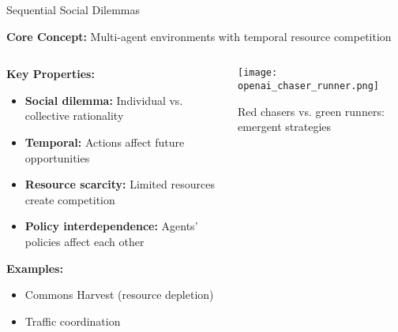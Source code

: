 \documentclass[aspectratio=169]{beamer}
\begin{document}
\begin{frame}{Sequential Social Dilemmas}
    
    \textbf{Core Concept:} Multi-agent environments with temporal resource competition \autocite{leibo_multi-agent_2017}
    
    \begin{columns}
        \begin{column}{0.6\textwidth}
            \textbf{Key Properties:}
            \begin{itemize}
                \item \textbf{Social dilemma:} Individual vs. collective rationality
                \item \textbf{Temporal:} Actions affect future opportunities
                \item \textbf{Resource scarcity:} Limited resources create competition
                \item \textbf{Policy interdependence:} Agents' policies affect each other
            \end{itemize}
            
            \textbf{Examples:}
            \begin{itemize}
                \item Commons Harvest (resource depletion)
                \item Traffic coordination
            \end{itemize}
        \end{column}
        \begin{column}{0.4\textwidth}
            \centering
            \texttt{[image: openai\_chaser\_runner.png]}
            
            \small{Red chasers vs. green runners: emergent strategies}
        \end{column}
    \end{columns}
\end{frame}
\end{document}

